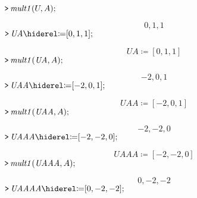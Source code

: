 \documentclass[11pt,a4paper,fleqn]{article}
\begin{document}
\begin{enumerate}[1.]
\begin{enumerate}[a.]
\begin{flushleft}
\begin{mdframed}
                \mapleinput
                {$ \displaystyle \texttt{>\,} \mathit{mult1} (U ,A); $}

                \begin{dmath}\label{(17)}
                    0,1,1
                \end{dmath}
                \mapleinput
                {$ \displaystyle \texttt{>\,} \mathit{UA} \coloneqq [0,1,1]; $}

                \begin{dmath}\label{(18)}
                    \mathit{UA} \coloneqq \left[0,1,1\right]
                \end{dmath}
                \mapleinput
                {$ \displaystyle \texttt{>\,} \mathit{mult1} (\mathit{UA} ,A); $}

                \begin{dmath}\label{(19)}
                    -2,0,1
                \end{dmath}
                \mapleinput
                {$ \displaystyle \texttt{>\,} \mathit{UAA} \coloneqq [-2,0,1]; $}

                \begin{dmath}\label{(20)}
                    \mathit{UAA} \coloneqq \left[-2,0,1\right]
                \end{dmath}
                \mapleinput
                {$ \displaystyle \texttt{>\,} \mathit{mult1} (\mathit{UAA} ,A); $}

                \begin{dmath}\label{(21)}
                    -2,-2,0
                \end{dmath}
                \mapleinput
                {$ \displaystyle \texttt{>\,} \mathit{UAAA} \coloneqq [-2,-2,0]; $}

                \begin{dmath}\label{(22)}
                    \mathit{UAAA} \coloneqq \left[-2,-2,0\right]
                \end{dmath}
                \mapleinput
                {$ \displaystyle \texttt{>\,} \mathit{mult1} (\mathit{UAAA} ,A); $}

                \begin{dmath}\label{(23)}
                    0,-2,-2
                \end{dmath}
                \mapleinput
                {$ \displaystyle \texttt{>\,} \mathit{UAAAA} \coloneqq [0,-2,-2]; $}


\end{mdframed}
\end{flushleft}
\end{enumerate}
\end{enumerate}
\end{document}

